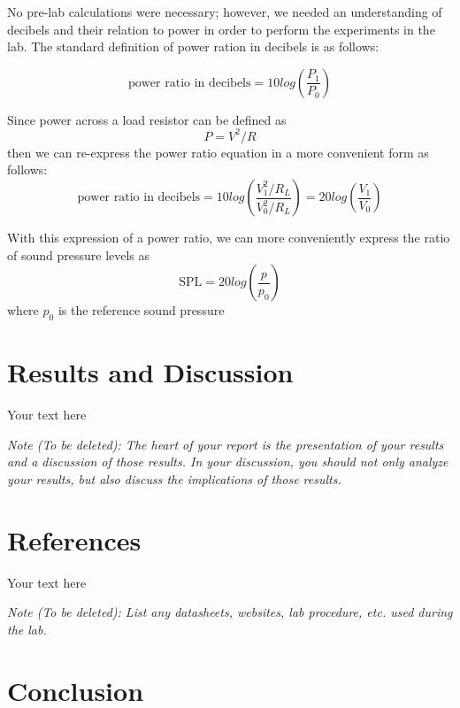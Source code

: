 \documentclass[10pt]{article}
\begin{document}
No pre-lab calculations were necessary; however, we needed an understanding of decibels and their relation to power in order to perform the experiments in the lab. The standard definition of power ration in decibels is as follows:

$$ \text{power ratio in decibels} = 10log(\frac{P_1}{P_0})$$

Since power across a load resistor can be defined as $$P = V^2/R$$then we can re-express the power ratio equation in a more convenient form as follows: $$\text{power ratio in decibels} = 10log(\frac{V_1^2/R_L}{V_0^2/R_L}) = 20log(\frac{V_1}{V_0})$$

With this expression of a power ratio, we can more conveniently express the ratio of sound pressure levels as $$\text{SPL} = 20log(\frac{p}{p_0})$$ where $p_0$ is the reference sound pressure 

\medskip


\section{Results and Discussion}

Your text here

\medskip

\textit{Note (To be deleted): The heart of your report is the presentation of your results and a discussion of those results. In your discussion, you should not only analyze your results, but also discuss the implications of those results.}

\section{References}

Your text here

\medskip

\textit{Note (To be deleted): List any datasheets, websites, lab procedure, etc. used during the lab.}

\section{Conclusion}
\end{document}
